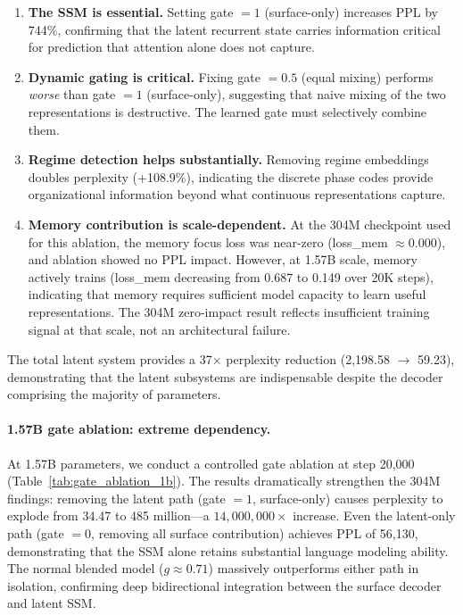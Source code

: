 \documentclass{article}
\begin{document}
\begin{enumerate}
    \item \textbf{The SSM is essential.} Setting gate $= 1$ (surface-only)
    increases PPL by 744\%, confirming that the latent recurrent state carries
    information critical for prediction that attention alone does not capture.

    \item \textbf{Dynamic gating is critical.} Fixing gate $= 0.5$ (equal
    mixing) performs \emph{worse} than gate $= 1$ (surface-only), suggesting
    that naive mixing of the two representations is destructive. The learned
    gate must selectively combine them.

    \item \textbf{Regime detection helps substantially.} Removing regime
    embeddings doubles perplexity (+108.9\%), indicating the discrete phase
    codes provide organizational information beyond what continuous
    representations capture.

    \item \textbf{Memory contribution is scale-dependent.} At the 304M
    checkpoint used for this ablation, the memory focus loss was near-zero
    (loss\_mem $\approx 0.000$), and ablation showed no PPL impact. However, at
    1.57B scale, memory actively trains (loss\_mem decreasing from 0.687 to
    0.149 over 20K steps), indicating that memory requires sufficient model
    capacity to learn useful representations. The 304M zero-impact result
    reflects insufficient training signal at that scale, not an architectural
    failure.
\end{enumerate}

The total latent system provides a 37$\times$ perplexity reduction
(2,198.58 $\to$ 59.23), demonstrating that the latent subsystems are
indispensable despite the decoder comprising the majority of parameters.

\paragraph{1.57B gate ablation: extreme dependency.}
At 1.57B parameters, we conduct a controlled gate ablation at step 20{,}000
(Table~\ref{tab:gate_ablation_1b}). The results dramatically strengthen the
304M findings: removing the latent path (gate $= 1$, surface-only) causes
perplexity to explode from 34.47 to 485 million---a $14{,}000{,}000\times$
increase. Even the latent-only path (gate $= 0$, removing all surface
contribution) achieves PPL of 56{,}130, demonstrating that the SSM alone
retains substantial language modeling ability. The normal blended model
($g \approx 0.71$) massively outperforms either path in isolation,
confirming deep bidirectional integration between the surface decoder and
latent SSM.
\end{document}

